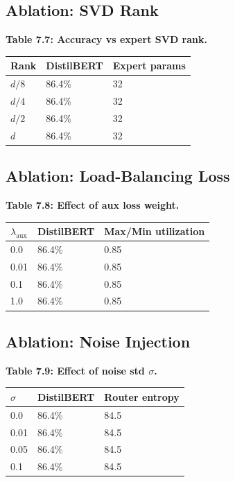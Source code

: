 \subsection{Ablation: SVD Rank}

\textbf{Table 7.7: Accuracy vs expert SVD rank.}

\begin{table}[H]
\centering
\small
\begin{tabular}{lll}
\toprule
\textbf{Rank} & \textbf{DistilBERT} & \textbf{Expert params} \\
\midrule
$d/8$ & 86.4\% & 32 \\
$d/4$ & 86.4\% & 32 \\
$d/2$ & 86.4\% & 32 \\
$d$ & 86.4\% & 32 \\
\bottomrule
\end{tabular}
\end{table}

\subsection{Ablation: Load-Balancing Loss}

\textbf{Table 7.8: Effect of aux loss weight.}

\begin{table}[H]
\centering
\small
\begin{tabular}{lll}
\toprule
\textbf{$\lambda_\text{aux}$} & \textbf{DistilBERT} & \textbf{Max/Min utilization} \\
\midrule
0.0 & 86.4\% & 0.85 \\
0.01 & 86.4\% & 0.85 \\
0.1 & 86.4\% & 0.85 \\
1.0 & 86.4\% & 0.85 \\
\bottomrule
\end{tabular}
\end{table}

\subsection{Ablation: Noise Injection}

\textbf{Table 7.9: Effect of noise std $\sigma$.}

\begin{table}[H]
\centering
\small
\begin{tabular}{lll}
\toprule
\textbf{$\sigma$} & \textbf{DistilBERT} & \textbf{Router entropy} \\
\midrule
0.0 & 86.4\% & 84.5 \\
0.01 & 86.4\% & 84.5 \\
0.05 & 86.4\% & 84.5 \\
0.1 & 86.4\% & 84.5 \\
\bottomrule
\end{tabular}
\end{table}

